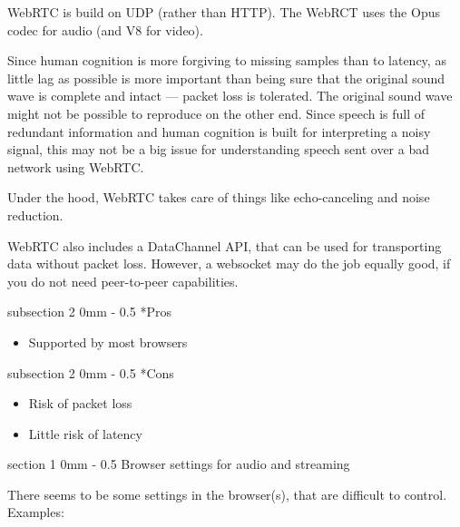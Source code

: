 \documentclass[11pt, a4paper, twoside]{article}
\makeatletter
\renewcommand{\subsection}{\@startsection
  {subsection}%
  {2}%
  {0mm}%
  {-\baselineskip}%
  {0.5\baselineskip}%
  {\bfseries\sffamily\large}}%
\renewcommand{\section}{\@startsection
  {section}%
  {1}%
  {0mm}%
  {-\baselineskip}%
  {0.5\baselineskip}%
  {\bfseries\sffamily\Large}}%
\makeatother
\begin{document}
WebRTC is build on UDP (rather than HTTP). The WebRCT uses the Opus
codec for audio (and V8 for video).

Since human cognition is more forgiving to missing samples than to
latency, as little lag as possible is more important than being sure
that the original sound wave is complete and intact --- packet loss is
tolerated. The original sound wave might not be possible to reproduce
on the other end. Since speech is full of redundant information and
human cognition is built for interpreting a noisy signal, this may not
be a big issue for understanding speech sent over a bad network using
WebRTC.

Under the hood, WebRTC takes care of things like echo-canceling and
noise reduction. 


WebRTC also includes a DataChannel API, that can be used for
transporting data without packet loss. However, a websocket may do the
job equally good, if you do not need peer-to-peer capabilities.

\subsection*{Pros}
\begin{itemize}
\item Supported by most browsers \cite{webrtcsupport}
\end{itemize}

\subsection*{Cons}
\begin{itemize}
\item Risk of packet loss
\item Little risk of latency
\end{itemize}



\section{Browser settings for audio and streaming}

There seems to be some settings in the browser(s), that are difficult to control. Examples:
\end{document}
